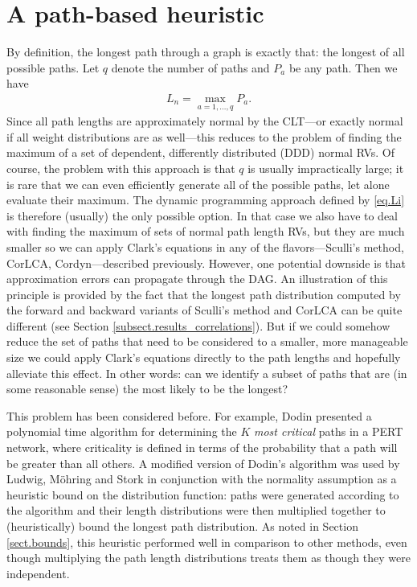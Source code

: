 \documentclass[12pt]{article}
\begin{document}
\section{A path-based heuristic}
\label{sect.path_heuristic}

By definition, the longest path through a graph is exactly that: the longest of all possible paths. Let $q$ denote the number of paths and $P_a$ be any path. Then we have
\begin{align}
  \label{eq.lp_definition}
  L_n = \max_{a = 1, \dots, q} P_a.
\end{align}
Since all path lengths are approximately normal by the CLT---or exactly normal if all weight distributions are as well---this reduces to the problem of finding the maximum of a set of dependent, differently distributed (DDD) normal RVs. Of course, the problem with this approach is that $q$ is usually impractically large; it is rare that we can even efficiently generate all of the possible paths, let alone evaluate their maximum. The dynamic programming approach defined by \eqref{eq.Li} is therefore (usually) the only possible option. In that case we also have to deal with finding the maximum of sets of normal path length RVs, but they are much smaller so we can apply Clark's equations in any of the flavors---Sculli's method, CorLCA, Cordyn---described previously. However, one potential downside is that approximation errors can propagate through the DAG. An illustration of this principle is provided by the fact that the longest path distribution computed by the forward and backward variants of Sculli's method and CorLCA can be quite different (see Section \ref{subsect.results_correlations}). But if we could somehow reduce the set of paths that need to be considered to a smaller, more manageable size we could apply Clark's equations directly to the path lengths and hopefully alleviate this effect. In other words: can we identify a subset of paths that are (in some reasonable sense) the most likely to be the longest?

This problem has been considered before. For example, Dodin \cite{dod84} presented a polynomial time algorithm for determining the $K$ {\em most critical} paths in a PERT network, where criticality is defined in terms of the probability that a path will be greater than all others. A modified version of Dodin's algorithm was used by Ludwig, M{\"o}hring and Stork \cite{lud01} in conjunction with the normality assumption as a heuristic bound on the distribution function: paths were generated according to the algorithm and their length distributions were then multiplied together to (heuristically) bound the longest path distribution. As noted in Section \ref{sect.bounds}, this heuristic performed well in comparison to other methods, even though multiplying the path length distributions treats them as though they were independent.
\end{document}
